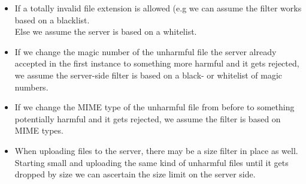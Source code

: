 {\begin{itemize}
\item If a totally invalid file extension is allowed (e.g  we can assume the filter works based on a blacklist.\\
Else we assume the server is based on a whitelist.
\item If we change the magic number of the unharmful file the server already accepted in the first instance to something more harmful and it gets rejected, we assume the server-side filter is based on a black- or whitelist of magic numbers. 
\item If we change the MIME type of the unharmful file from before to something potentially harmful and it gets rejected, we assume the filter is based on MIME types.
\item When uploading files to the server, there may be a size filter in place as well. Starting small and uploading the same kind of unharmful files until it gets dropped by size we can ascertain the size limit on the server side. 
\end{itemize}
}
